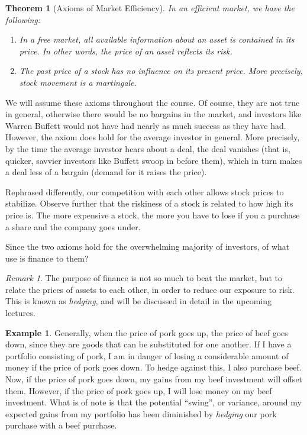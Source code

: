 \documentclass[12pt]{article}
\theoremstyle{plain}
\newtheorem{theorem}{Theorem}
\theoremstyle{definition}
\newtheorem*{example}{Example}
\theoremstyle{remark}
\newtheorem*{remark}{Remark}
\numberwithin{equation}{section}  %
\begin{document}
\begin{theorem}[Axioms of Market Efficiency]
    In an efficient market, we have the following: 
    \begin{enumerate}
        \item 
            In a free market, all available information about an asset is contained in its price. In other words, the price of an asset reflects its risk.
        \item 
            The past price of a stock has no influence on its present price. More precisely,
            stock movement is a martingale.
    \end{enumerate}
\end{theorem}
We will assume these axioms throughout the course. Of course, they are not true in general, otherwise there would be no bargains in the market, and investors like Warren Buffett would not have had nearly as much success as they have had. However, the axiom does hold for the average investor in general. More precisely, by the time the average investor hears about a deal, the deal vanishes (that is, quicker, savvier investors like Buffett swoop in before them), which in turn makes a deal less of a bargain (demand for it raises the price). 

Rephrased differently, our competition with each other allows stock prices to stabilize. Observe further that the riskiness of a stock is related to how high its price is.
The more expensive a stock, the more you have to lose if you a purchase a share and the company goes under. 

Since the two axioms hold for the overwhelming majority of investors, of what use
is finance to them? 
\begin{remark}
    The purpose of finance is not so much to beat the market,
    but to relate the prices of assets to each other, in order to reduce our exposure to risk. This is known as \emph{hedging}, and will be discussed in detail in the upcoming lectures.  
\end{remark}
\begin{example}
    Generally, when the price of pork goes up, the price of beef goes down, since they are goods that can be substituted for one another. If I have a portfolio consisting of pork, I am in danger of losing a considerable amount of money if the price of pork goes down. To hedge against this, I also purchase beef. Now, if the price of pork goes down, my gains from my beef investment will offset them. However, if the price of pork goes up, I will lose money on my beef investment. What is of note is that the potential ``swing'', or variance, around my expected gains from my portfolio has been diminished by \emph{hedging} our pork purchase with a beef purchase.
\end{example}
\end{document}
